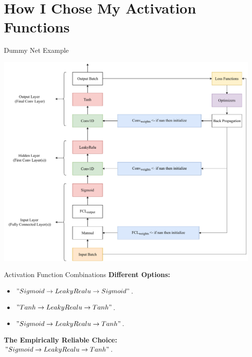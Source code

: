 \documentclass{beamer}
\begin{document}
	\section{How I Chose My Activation Functions}
	\begin{frame}{Dummy Net Example}
		\begin{center}
			\includegraphics[height=0.9\textheight]{SimpleNetDiagram}
		\end{center}
	\end{frame}
		\begin{frame}{Activation Function Combinations}
			\textbf{Different Options:}
			\begin{itemize}
				\item $" Sigmoid \rightarrow LeakyRealu \rightarrow Sigmoid "$.
				\item $" Tanh \rightarrow LeakyRealu \rightarrow Tanh "$.
				\item $" Sigmoid \rightarrow LeakyRealu \rightarrow Tanh "$.
			\end{itemize}
			\textbf{The Empirically Reliable Choice:}\\
			\centering $" Sigmoid \rightarrow LeakyRealu \rightarrow Tanh "$.
		\end{frame}
\end{document}
